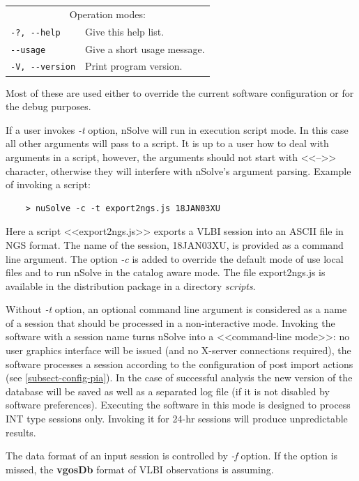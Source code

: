 \documentclass [10pt,letterpaper]{report}
\newcommand{\nuSolve}{\greektext n\latintext Solve}
\begin{document}
{\begin{tabular}{p{\leftSp}p{\riteSp}}
\multicolumn{2}{c}{Operation modes:}\\
{\tt -?, -{}-help}              & Give this help list.\\
{\tt     -{}-usage}             & Give a short usage message.\\
{\tt -V, -{}-version}           & Print program version.\\
\end{tabular}
\vspace{5mm}

\noindent
Most of these are used either to override the current software
configuration or for the debug purposes.

If a user invokes {\sl -t} option, \nuSolve{} will run in execution
script mode. In this case all other arguments will pass to a script.
It is up to a user how to deal with arguments in a script, however,
the arguments should not start with <<-->> character, otherwise they
will interfere with \nuSolve{}'s argument parsing. Example of invoking
a script:
\begin{verbatim}
    > nuSolve -c -t export2ngs.js 18JAN03XU
\end{verbatim}
\noindent
Here a script <<export2ngs.js>> exports a VLBI session into an ASCII file
in NGS format. The name of the session, 18JAN03XU, is provided as a
command line argument. The option {\sl -c} is added to override the default
mode of use local files and to run \nuSolve{} in the catalog aware mode.
The file export2ngs.js is available in the distribution package in a
directory {\sl scripts}.

Without {\sl -t} option, an optional command line argument is considered
as a name of a session that should be processed in a non-interactive mode.
Invoking the software with a session name turns \nuSolve{} into a
<<command-line mode>>: no user graphics interface will be issued (and no
X-server connections required), the software processes a session according
to the configuration of post import actions (see \ref{subsect-config-pia}).
In the case of successful analysis the new version of the database will
be saved as well as a separated log file (if it is not disabled by software
preferences). Executing the software in this mode is designed to process
INT type sessions only. Invoking it for 24-hr sessions will produce
unpredictable results.

The data format of an input session is controlled by {\sl -f} option. If
the option is missed, the {\bf vgosDb} format of VLBI observations is
assuming.

}
\end{document}
